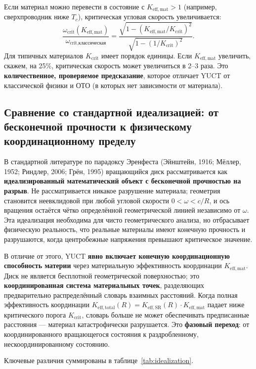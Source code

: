 \documentclass[12pt,a4paper]{article}
\newcommand{\Keffmat}{K_{\mathrm{eff,mat}}}
\newcommand{\Kefftot}{K_{\mathrm{eff,total}}}
\newcommand{\KeffSR}{K_{\mathrm{eff,SR}}}
\newcommand{\Kcrit}{K_{\mathrm{crit}}}
\begin{document}
	Если материал можно перевести в состояние с \(\Keffmat > 1\) (например, сверхпроводник ниже \(T_c\)), критическая угловая скорость увеличивается:
	\[
	\frac{\omega_{\text{crit}}(K_{\mathrm{eff,mat}})}{\omega_{\text{crit,классическая}}} = \frac{ \sqrt{1 - (\Keffmat/\Kcrit)^2} }{ \sqrt{1 - (1/\Kcrit)^2} }.
	\]
	Для типичных материалов \(\Kcrit\) имеет порядок единицы. Если \(\Keffmat\) увеличить, скажем, на 25\%, критическая скорость может увеличиться в 2–3 раза. Это \textbf{количественное, проверяемое предсказание}, которое отличает YUCT от классической физики и ОТО (в которых нет зависимости от материала).
	
	\subsection{Сравнение со стандартной идеализацией: от бесконечной прочности к физическому координационному пределу}
	
	В стандартной литературе по парадоксу Эренфеста (Эйнштейн, 1916; Мёллер, 1952; Риндлер, 2006; Грён, 1995) вращающийся диск рассматривается как \textbf{идеализированный математический объект с бесконечной прочностью на разрыв}. Не рассматривается никакое разрушение материала; геометрия становится неевклидовой при любой угловой скорости \(0 < \omega < c/R\), и ось вращения остаётся чётко определённой геометрической линией независимо от \(\omega\). Эта идеализация необходима для чисто геометрического анализа, но отбрасывает физическую реальность, что реальные материалы имеют конечную прочность и разрушаются, когда центробежные напряжения превышают критическое значение.
	
	В отличие от этого, YUCT \textbf{явно включает конечную координационную способность материи} через материальную эффективность координации \(K_{\mathrm{eff,mat}}\). Диск не является бесплотной геометрической поверхностью; это \textbf{координированная система материальных точек}, разделяющих предварительно распределённый словарь взаимных расстояний. Когда полная эффективность координации \(\Kefftot(R) = \KeffSR(R) \cdot \Keffmat\) падает ниже критического порога \(\Kcrit\), словарь больше не может обеспечивать предписанные расстояния — материал катастрофически разрушается. Это \textbf{фазовый переход}: от координированного вращающегося состояния к раздробленному, нескоординированному состоянию.
	
	Ключевые различия суммированы в таблице~\ref{tab:idealization}.
	
\end{document}
